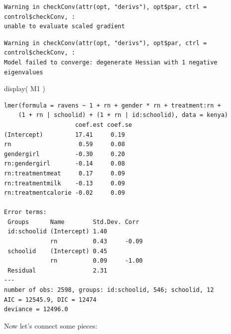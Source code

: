 \documentclass[
  letterpaper,
  DIV=11,
  numbers=noendperiod]{scrreprt}
\newenvironment{Shaded}{\begin{snugshade}}{\end{snugshade}}
\newcommand{\FunctionTok}[1]{\textcolor[rgb]{0.02,0.16,0.49}{#1}}
\newcommand{\NormalTok}[1]{\textcolor[rgb]{0.00,0.44,0.13}{#1}}
\begin{document}
\begin{verbatim}
Warning in checkConv(attr(opt, "derivs"), opt$par, ctrl = control$checkConv, :
unable to evaluate scaled gradient
\end{verbatim}

\begin{verbatim}
Warning in checkConv(attr(opt, "derivs"), opt$par, ctrl = control$checkConv, :
Model failed to converge: degenerate Hessian with 1 negative eigenvalues
\end{verbatim}

\begin{Shaded}
\begin{Highlighting}[]
\FunctionTok{display}\NormalTok{( M1 )}
\end{Highlighting}
\end{Shaded}

\begin{verbatim}
lmer(formula = ravens ~ 1 + rn + gender * rn + treatment:rn + 
    (1 + rn | schoolid) + (1 + rn | id:schoolid), data = kenya)
                    coef.est coef.se
(Intercept)         17.41     0.19  
rn                   0.59     0.08  
gendergirl          -0.30     0.20  
rn:gendergirl       -0.14     0.08  
rn:treatmentmeat     0.17     0.09  
rn:treatmentmilk    -0.13     0.09  
rn:treatmentcalorie -0.02     0.09  

Error terms:
 Groups      Name        Std.Dev. Corr  
 id:schoolid (Intercept) 1.40           
             rn          0.43     -0.09 
 schoolid    (Intercept) 0.45           
             rn          0.09     -1.00 
 Residual                2.31           
---
number of obs: 2598, groups: id:schoolid, 546; schoolid, 12
AIC = 12545.9, DIC = 12474
deviance = 12496.0 
\end{verbatim}

Now let's connect some pieces:
\end{document}
